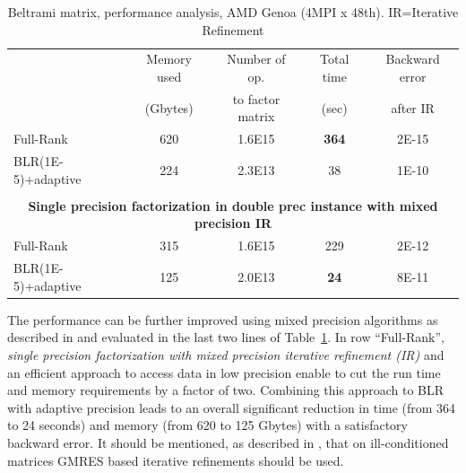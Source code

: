 \documentclass[a4paper,12pt]{article}
\begin{document}
\begin{table}[hb]
  \small
    \begin{center}
        \begin{tabular}{|l|c|c|c|c|}
            \hline
                               & {Memory used} & Number of op.    & Total time         & Backward error            \\
                               & (Gbytes)      & to factor matrix & (sec)              & after IR                  \\
            \hline
            Full-Rank          & {620}         & {1.6E15}         & {\bf 364}          & 2E-15                     \\
            BLR(1E-5)+adaptive & 224           & 2.3E13           & \phantom{0}38      & 1E-10                     \\
            \hline
            \multicolumn{5}{c}{ }                                                                                  \\
            \multicolumn{5}{c}{\bf Single precision factorization in double prec instance with mixed precision IR} \\
            \hline
            Full-Rank          & 315           & 1.6E15           & 229                & 2E-12                     \\
            BLR(1E-5)+adaptive & {125}         & {2.0E13}         & \bf{\phantom{0}24} & 8E-11                     \\

            \hline
        \end{tabular}
        \caption{\label{t:beltrami} Beltrami matrix, performance analysis, AMD Genoa (4MPI x 48th). IR=Iterative Refinement}
    \end{center}
\end{table}

The performance can be further improved using mixed precision algorithms as described in \cite{abhl22a} and evaluated in the last two lines of Table~\ref{t:beltrami}.
In row ``Full-Rank'', {\it single precision factorization with mixed precision iterative refinement (IR)} and an efficient approach to access data in low precision  \citep{ajlmp:2025} enable to cut the run time and memory requirements by a factor of two.
Combining this approach to BLR with adaptive precision leads to an overall significant reduction in time (from 364 to 24 seconds) and memory (from 620 to 125 Gbytes) with a satisfactory backward error.
It should be mentioned, as described in \cite{abhl22a}, that on ill-conditioned matrices GMRES based iterative refinements should be used.
\end{document}
